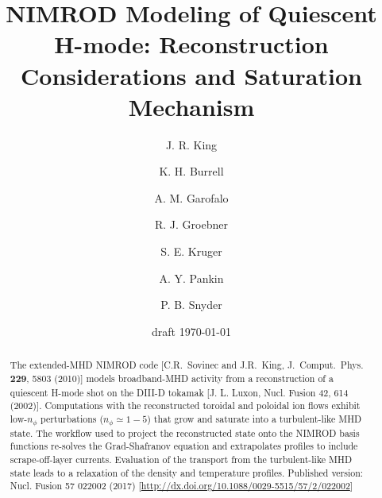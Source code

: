 \documentclass[english,aps,superscriptaddress,showkeys,showpacs,prepri,twocolumn]{revtex4}
\begin{document}
\title{NIMROD Modeling of Quiescent H-mode: Reconstruction Considerations and
Saturation Mechanism}

\author{J. R. King}

\author{K. H. Burrell}

\author{A. M. Garofalo}

\author{R. J. Groebner}

\author{S. E. Kruger}

\author{A. Y. Pankin}

\author{P. B. Snyder}

\date{draft \today}
\begin{abstract}
The extended-MHD NIMROD code [C.R.~Sovinec and J.R.~King, J.~Comput.~Phys.~{\bf
229}, 5803 (2010)] models broadband-MHD activity from a reconstruction of a
quiescent H-mode shot on the DIII-D tokamak [J. L. Luxon, Nucl. Fusion 42, 614
(2002)]. Computations with the reconstructed toroidal and
poloidal ion flows exhibit low-$n_\phi$ perturbations ($n_\phi\simeq1-5$) that
grow and saturate into a turbulent-like MHD state. The workflow used to project
the reconstructed state onto the NIMROD basis functions re-solves the
Grad-Shafranov equation and extrapolates profiles to include scrape-off-layer
currents. Evaluation of the transport from the turbulent-like MHD state leads
to a relaxation of the density and temperature profiles. 
Published version: Nucl. Fusion 57 022002 (2017) [\url{http://dx.doi.org/10.1088/0029-5515/57/2/022002}]
\end{abstract}


\maketitle



%   


%
 
\appendix
\end{document}
